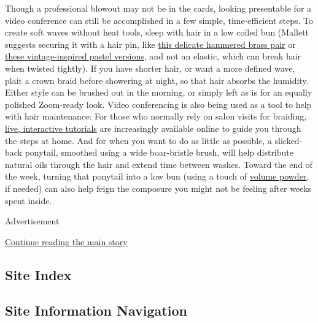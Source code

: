 Though a professional blowout may not be in the cards, looking
presentable for a video conference can still be accomplished in a few
simple, time-efficient steps. To create soft waves without heat tools,
sleep with hair in a low coiled bun (Mallett suggests securing it with a
hair pin, like
\href{https://www.etsy.com/listing/594706250/set-of-2-gold-hair-pins-hammered-brass?ga_order=most_relevant\&ga_search_type=all\&ga_view_type=gallery\&ga_search_query=hair+pin\&ref=sr_gallery-1-4\&organic_search_click=1\&bes=1}{this
delicate hammered brass pair} or
\href{https://www.jenny-walton.com/product-page/pastel-hair-pin}{these
vintage-inspired pastel versions}, and not an elastic, which can break
hair when twisted tightly). If you have shorter hair, or want a more
defined wave, plait a crown braid before showering at night, so that
hair absorbs the humidity. Either style can be brushed out in the
morning, or simply left as is for an equally polished Zoom-ready look.
Video conferencing is also being used as a tool to help with hair
maintenance: For those who normally rely on salon visits for braiding,
\href{https://www.nytimes3xbfgragh.onion/2020/03/27/style/black-girl-women-hair-styling-live-tutorials-coronavirus.html}{live,
interactive tutorials} are increasingly available online to guide you
through the steps at home. And for when you want to do as little as
possible, a slicked-back ponytail, smoothed using a wide boar-bristle
brush, will help distribute natural oils through the hair and extend
time between washes. Toward the end of the week, turning that ponytail
into a low bun (using a touch of
\href{https://playabeauty.com/products/soft-volume-powder?variant=12731480014937\&currency=USD\&utm_source=adwords\&gclid=EAIaIQobChMI85P64OXH6AIVi7bICh3IUwnCEAQYASABEgLiUPD_BwE}{volume
powder}, if needed) can also help feign the composure you might not be
feeling after weeks spent inside.

Advertisement

\protect\hyperlink{after-bottom}{Continue reading the main story}

\hypertarget{site-index}{%
\subsection{Site Index}\label{site-index}}

\hypertarget{site-information-navigation}{%
\subsection{Site Information
Navigation}\label{site-information-navigation}}

